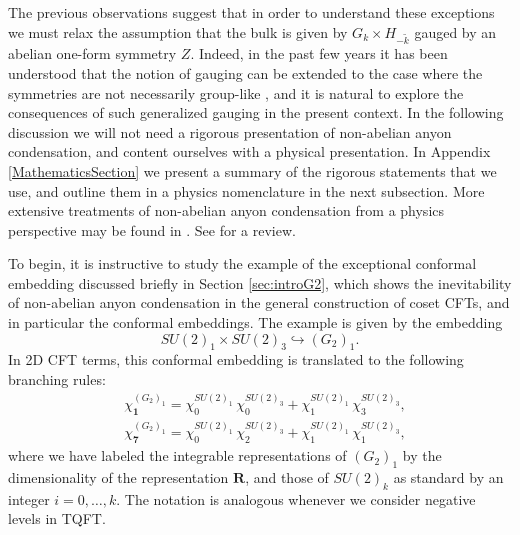 \documentclass[11pt]{article}
\numberwithin{equation}{section}
\begin{document}
The previous observations suggest that in order to understand these exceptions we must relax the assumption that the bulk is given by $G_{k} \times H_{-\tilde{k}}$ gauged by an abelian one-form symmetry $Z$. Indeed, in the past few years it has been understood that the notion of gauging can be extended to the case where the symmetries are not necessarily group-like \cite{Bais:2008ni,  Eliens:2013epa, Hung:2015hfa, neupert2016boson, Bhardwaj:2017xup, Gaiotto:2019xmp, Yu:2021zmu, Huang:2021zvu, Kaidi:2021gbs,Roumpedakis:2022aik, Choi:2023xjw, Choi:2023vgk, Diatlyk:2023fwf, Perez-Lona:2023djo} , and it is natural to explore the consequences of such generalized gauging in the present context. In the following discussion we will not need a rigorous presentation of non-abelian anyon condensation, and content ourselves with a physical presentation. In Appendix \ref{MathematicsSection} we present a summary of the rigorous statements that we use, and outline them in a physics nomenclature in the next subsection. More extensive treatments of non-abelian anyon condensation from a physics perspective may be found in \cite{Bais:2008ni,kong2014anyon,Eliens:2013epa,neupert2016boson}. See \cite{Burnell_2018} for a review.

To begin, it is instructive to study the example of the exceptional conformal embedding discussed briefly in Section \ref{sec:introG2}, which shows the inevitability of non-abelian anyon condensation in the general construction of coset CFTs, and in particular the conformal embeddings. The example is given by the embedding
 \begin{equation}
    SU(2)_{1} \times SU(2)_{3} \hookrightarrow (G_{2})_{1}.
\end{equation}
In 2D CFT terms, this conformal embedding is translated to the following branching rules:
\begin{align} \label{examplebranchingrules1}
    & \chi^{(G_{2})_{1}}_{\mathbf{1}} = \chi^{SU(2)_{1}}_{0} \, \chi^{SU(2)_{3}}_{0} + \chi^{SU(2)_{1}}_{1} \, \chi^{SU(2)_{3}}_{3}, \\[0.3cm]
    & \chi^{(G_{2})_{1}}_{\mathbf{7}} = \chi^{SU(2)_{1}}_{0} \, \chi^{SU(2)_{3}}_{2} + \chi^{SU(2)_{1}}_{1} \, \chi^{SU(2)_{3}}_{1},  \label{examplebranchingrules2}
\end{align}
where we have labeled the integrable representations of $(G_{2})_{1}$ by the dimensionality of the representation $\mathbf{R}$, and those of $SU(2)_{k}$ as standard by an integer $i=0,\ldots,k$. The notation is analogous whenever we consider negative levels in TQFT.
\end{document}
